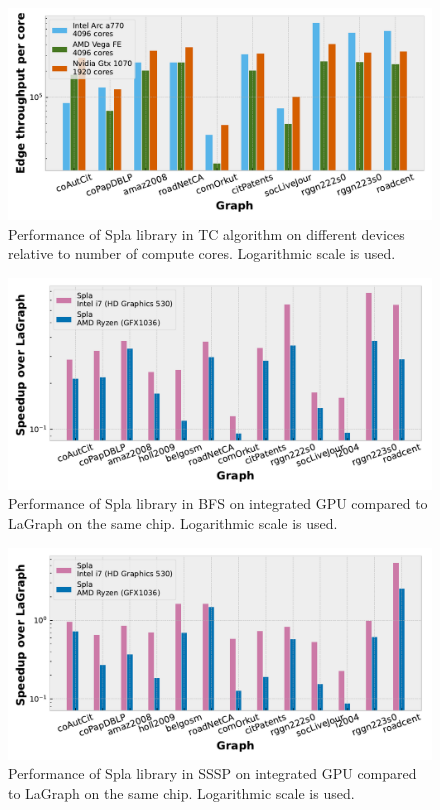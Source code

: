 \begin{figure}[tbp]
\centering
\includegraphics[width=0.9\linewidth]{plots/rq2_cores_tc.pdf}
\caption{Performance of Spla library in TC algorithm on different devices relative to number of compute cores. Logarithmic scale is used.}
\label{fig:rq2_tc}
\end{figure}


\begin{figure}[tbp]
\centering
\includegraphics[width=0.9\linewidth]{plots/rq3_int_bfs.pdf}
\caption{Performance of Spla library in BFS on integrated GPU compared to LaGraph on the same chip. Logarithmic scale is used.}
\label{fig:rq3_bfs}
\end{figure}

\begin{figure}[tbp]
\centering
\includegraphics[width=0.9\linewidth]{plots/rq3_int_sssp.pdf}
\caption{Performance of Spla library in SSSP on integrated GPU compared to LaGraph on the same chip. Logarithmic scale is used.}
\label{fig:rq3_sssp}
\end{figure}

